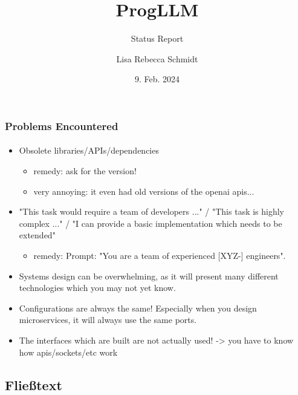 \documentclass[t]{beamer}
\title{ProgLLM}
\subtitle{Status Report}
\author{Lisa Rebecca Schmidt}
\institute[\PSName{}]{Friedrich-Alexander-Universität Erlangen-Nürnberg}
\date[Datum]{9. Feb. 2024}
\begin{document}
\begin{frame}[plain,c]
  \titlepage
\end{frame}





\begin{frame}
  \frametitle{Problems Encountered}
  \framesubtitle{ }

  \begin{itemize}
    \item Obsolete libraries/APIs/dependencies
    \begin{itemize}
        \item remedy: ask for the version!
        \item very annoying: it even had old versions of the openai apis...
    \end{itemize}
    \item "This task would require a team of developers ..." / "This task is highly complex ..." / "I can provide a basic implementation which needs to be extended"
    \begin{itemize}
        \item remedy: Prompt: "You are a team of experienced [XYZ-] engineers".
    \end{itemize}
    \item Systems design can be overwhelming, as it will present many different technologies which you may not yet know.
    \item Configurations are always the same! Especially when you design microservices, it will always use the same ports.
    \item The interfaces which are built are not actually used! -> you have to know how apis/sockets/etc work
  \end{itemize}


\end{frame}

\subsection{Fließtext}
\end{document}
